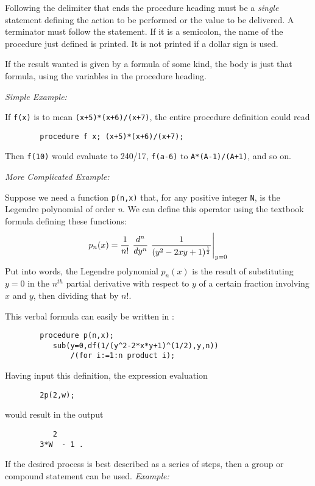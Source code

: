 Following the delimiter that ends the procedure heading must be a {\em
single} statement defining the action to be performed or the value to be
delivered.  A terminator must follow the statement.  If it is a semicolon,
the name of the procedure just defined is printed.  It is not printed if a
dollar sign is used.

If the result wanted is given by a formula of some kind, the body is just
that formula, using the variables in the procedure heading.

{\it Simple Example:}

If {\tt f(x)} is to mean {\tt (x+5)*(x+6)/(x+7)}, the entire procedure
definition could read
\begin{verbatim}
        procedure f x; (x+5)*(x+6)/(x+7);
\end{verbatim}
Then {\tt f(10)} would evaluate to 240/17, {\tt f(a-6)} to
{\tt A*(A-1)/(A+1)}, and so on.

{\it More Complicated Example:}

Suppose we need a function {\tt p(n,x)} that, for any positive integer
{\tt N}, is the Legendre polynomial of order
{\em n}. We can define this operator using the
textbook formula defining these functions:
\begin{displaymath}
p_n(x) = \displaystyle{1\over{n!}}\  
\displaystyle{d^n\over dy^n}\ \displaystyle{{1\over{(y^2 - 2xy + 1)
^{{1\over2}}}}}\Bigg\vert_{y=0}
\end{displaymath}
Put into words, the Legendre polynomial $p_n(x)$ is the result of
substituting $y=0$ in the $n^{th}$ partial derivative with respect to $y$
of a certain fraction involving $x$ and $y$, then dividing that by $n!$.

This verbal formula can easily be written in {\REDUCE}:
\begin{verbatim}
        procedure p(n,x);
           sub(y=0,df(1/(y^2-2*x*y+1)^(1/2),y,n))
               /(for i:=1:n product i);
\end{verbatim}
Having input this definition, the expression evaluation
\begin{verbatim}
        2p(2,w);
\end{verbatim}
would result in the output
\begin{verbatim}
           2
        3*W  - 1 .
\end{verbatim}
If the desired process is best described as a series of steps, then a group
or compound statement can be used.
\extendedmanual{\newpage}
{\it Example:}

